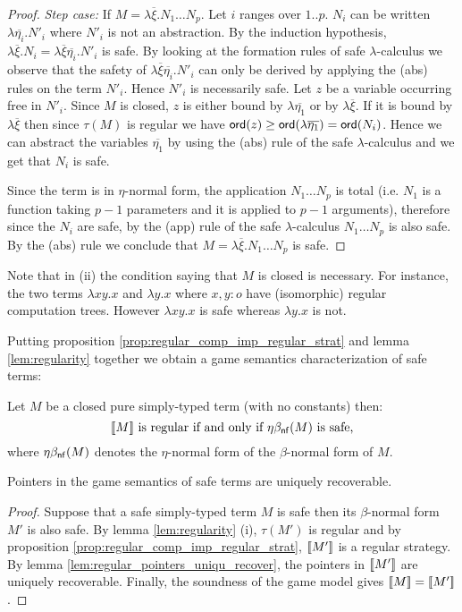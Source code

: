 \begin{proof}
\emph{Step case:} If $M = \lambda \overline{\xi} . N_1 \ldots N_p$.
Let $i$ ranges over $1..p$. $N_i$ can be written $\lambda \overline{\eta_i} . N'_i$ where $N'_i$ is not an abstraction.
By the induction hypothesis, $\lambda \overline{\xi} . N_i = \lambda \overline{\xi} \overline{\eta_i} . N'_i$ is safe.
By looking at the formation rules of safe $\lambda$-calculus we observe that the safety
of $\lambda \overline{\xi} \overline{\eta_i} . N'_i$ can only be derived by applying the (abs) rules on the term $N'_i$. Hence
$N'_i$ is necessarily safe.
Let $z$ be a variable occurring free in $N'_i$. Since $M$ is closed, $z$ is either bound by $\lambda \overline{\eta_1}$ or by $\lambda \overline{\xi}$.
If it is bound by $\lambda \overline{\xi}$ then since $\tau(M)$ is regular we have ${\sf ord}(z) \geq {\sf ord}(\lambda \overline{\eta_1}) = {\sf ord}(N_i)$.
Hence we can abstract the variables $\overline{\eta_1}$ by using the (abs) rule of the safe $\lambda$-calculus and we get that $N_i$ is safe.

Since the term is in $\eta$-normal form, the application $N_1 \ldots N_p$ is total (i.e. $N_1$ is a function taking $p-1$ parameters
and it is applied to $p-1$ arguments), therefore since the $N_i$ are safe, by the (app) rule of the safe $\lambda$-calculus
$N_1 \ldots N_p$ is also safe.
By the (abs) rule we conclude that $M = \lambda \overline{\xi} . N_1 \ldots N_p$ is safe.
\end{proof}

Note that in (ii) the condition saying that $M$ is closed is necessary.  For instance, the two terms
$\lambda x y .x$ and $\lambda y . x$ where $x,y:o$ have (isomorphic) regular computation trees. However $\lambda x y .x$ is safe
whereas $\lambda y . x$ is not.



Putting proposition \ref{prop:regular_comp_imp_regular_strat} and lemma \ref{lem:regularity} together we
obtain a game semantics characterization of safe terms:
\begin{cor}
Let $M$ be a closed pure simply-typed term (with no constants) then:
$$ {[\![ M ]\!]} \mbox{ is regular if and only if $\eta\beta_{\sf nf}(M)$ is safe,} $$
where $\eta\beta_{\sf nf}(M)$ denotes the $\eta$-normal form of the $\beta$-normal form of $M$.
\end{cor}



\begin{thm}
Pointers in the game semantics of safe terms are uniquely recoverable.
\end{thm}
\begin{proof}
Suppose that a safe simply-typed term $M$ is safe then its $\beta$-normal form $M'$ is also safe.
By lemma \ref{lem:regularity} (i), $\tau(M')$ is regular and
by proposition \ref{prop:regular_comp_imp_regular_strat},
${[\![ M' ]\!]}$ is a regular strategy.
By lemma \ref{lem:regular_pointers_uniqu_recover}, the pointers in ${[\![ M' ]\!]}$ are uniquely recoverable.
Finally, the soundness of the game model gives ${[\![ M ]\!]} = {[\![ M' ]\!]}$.
\end{proof}


